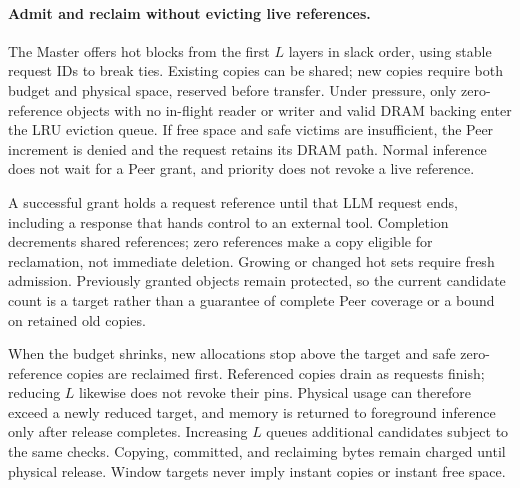 \paragraph{Admit and reclaim without evicting live references.}
The Master offers hot blocks from the first $L$ layers in slack order,
using stable request IDs to break ties. Existing copies can be shared;
new copies require both budget and physical space, reserved before
transfer. Under pressure, only zero-reference objects with no in-flight
reader or writer and valid DRAM backing enter the LRU eviction queue.
If free space and safe victims are insufficient, the Peer increment is
denied and the request retains its DRAM path. Normal inference does not
wait for a Peer grant, and priority does not revoke a live reference.

A successful grant holds a request reference until that LLM request
ends, including a response that hands control to an external tool.
Completion decrements shared references; zero references make a copy
eligible for reclamation, not immediate deletion. Growing or changed
hot sets require fresh admission. Previously granted objects remain
protected, so the current candidate count is a target rather than a
guarantee of complete Peer coverage or a bound on retained old copies.

When the budget shrinks, new allocations stop above the target and
safe zero-reference copies are reclaimed first. Referenced copies drain
as requests finish; reducing $L$ likewise does not revoke their pins.
Physical usage can therefore exceed a newly reduced target, and memory
is returned to foreground inference only after release completes.
Increasing $L$ queues additional candidates subject to the same checks.
Copying, committed, and reclaiming bytes remain charged until physical
release. Window targets never imply instant copies or instant free space.
